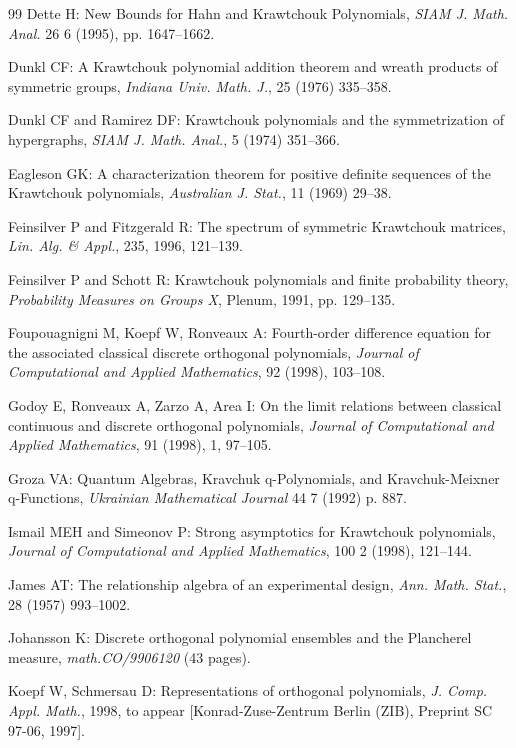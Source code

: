 \begin{thebibliography}{99}
 Dette H: New Bounds for Hahn and Krawtchouk Polynomials, \emph{SIAM J. Math. Anal.} 26 6 (1995), pp. 1647--1662.

 Dunkl CF: A Krawtchouk polynomial addition theorem and wreath products of symmetric groups, \emph{Indiana Univ. Math. J.}, 25 (1976) 335--358.

 Dunkl CF and Ramirez DF: Krawtchouk polynomials and the symmetrization of hypergraphs, \emph{SIAM J. Math. Anal.}, 5 (1974) 351--366.

 Eagleson GK: A characterization theorem for positive definite sequences of the Krawtchouk polynomials, \emph{Australian J. Stat.}, 11 (1969) 29--38.

 Feinsilver P and Fitzgerald R: The spectrum of symmetric Krawtchouk matrices, \emph{Lin. Alg. \& Appl.}, 235, 1996, 121--139.

 Feinsilver P and Schott R: Krawtchouk polynomials and finite probability theory, \emph{Probability Measures on Groups X}, Plenum, 1991, pp. 129--135.

 Foupouagnigni M, Koepf W, Ronveaux A: Fourth-order difference equation for the associated classical discrete orthogonal polynomials, \emph{Journal of Computational and Applied Mathematics}, 92 (1998), 103--108.

 Godoy E, Ronveaux A, Zarzo A, Area I: On the limit relations between classical continuous and discrete orthogonal polynomials, \emph{Journal of Computational and Applied Mathematics}, 91 (1998), 1, 97--105.

 Groza VA: Quantum Algebras, Kravchuk q-Polynomials, and Kravchuk-Meixner q-Functions, \emph{Ukrainian Mathematical Journal} 44 7 (1992) p. 887.

 Ismail MEH and Simeonov P: Strong asymptotics for Krawtchouk polynomials, \emph{Journal of Computational and Applied Mathematics}, 100 2 (1998), 121--144.

 James AT: The relationship algebra of an experimental design, \emph{Ann. Math. Stat.}, 28 (1957) 993--1002.

 Johansson K: Discrete orthogonal polynomial ensembles and the Plancherel measure, \emph{math.CO/9906120} (43 pages).

 Koepf W, Schmersau D: Representations of orthogonal polynomials, \emph{J. Comp. Appl. Math.}, 1998, to appear [Konrad-Zuse-Zentrum Berlin (ZIB), Preprint SC 97-06, 1997].


\end{thebibliography}
